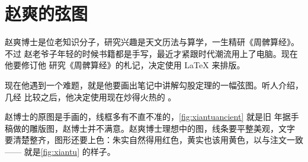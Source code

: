 
\chapter{赵爽的弦图}
\label{chap:xiantu}

赵爽博士是位老知识分子，研究兴趣是天文历法与算学，一生精研《周髀算经》。不过
赵老爷子年轻的时候书籍都是手写，最近才紧跟时代潮流用上了电脑。现在他要修订他
研究《周髀算经》的札记，决定使用 \LaTeX{} 来排版。

现在他遇到一个难题，就是他要画出笔记中讲解勾股定理的一幅弦图。听人介绍，几经
比较之后，他决定使用现在炒得火热的 \Asy{}。

赵博士的原图是手画的，线框多有不直不准的，\autoref{fig:xiantuancient} 就是旧
年据手稿做的雕版图，赵博士并不满意。赵爽博士理想中的图，线条要平整美观，文字
要清楚整齐，图形还要上色：朱实自然得用红色，黄实也该用黄色，以与注文一致——
就是\autoref{fig:xiantu} 的样子。


